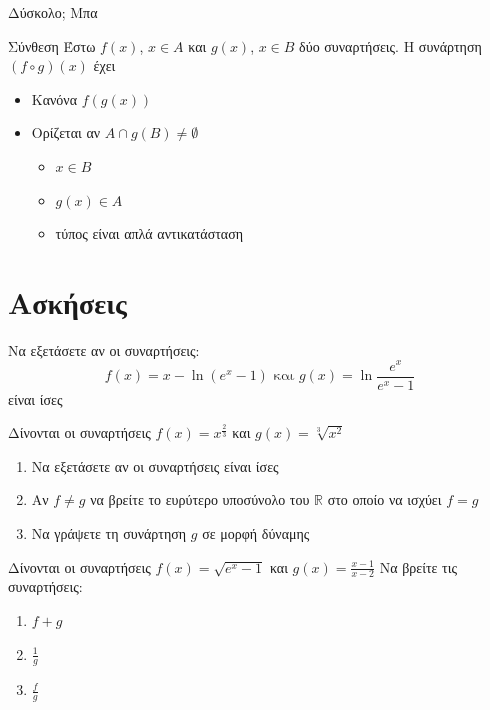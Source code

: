 \documentclass{presentation}
\begin{document}
\begin{frame}{Δύσκολο; Μπα}
  \begin{block}{Σύνθεση}
    Έστω $f(x)$, $x\in Α$ και $g(x)$, $x\in Β$ δύο συναρτήσεις. Η συνάρτηση $(f\circ g)(x)$ έχει
    \begin{itemize}
      \item Κανόνα $f(g(x))$
      \item Ορίζεται αν $Α\cap g(Β)\ne \emptyset$
            \begin{itemize}
              \item<2-> $x\in Β$
              \item<3-> $g(x)\in Α$
              \item<4-> τύπος είναι απλά αντικατάσταση
            \end{itemize}
    \end{itemize}
  \end{block}
\end{frame}

\section{Ασκήσεις}

\begin{askisi}
  Να εξετάσετε αν οι συναρτήσεις:
  $$f(x)=x-\ln (e^x-1) \text{ και } g(x)=\ln\frac{e^x}{e^x-1}$$
  είναι ίσες

\end{askisi}

\begin{askisi}
  Δίνονται οι συναρτήσεις $f(x)=x^{\frac{2}{3}}$ και $g(x)=\sqrt[3]{x^2}$
  \begin{enumerate}
    \item<1-> Να εξετάσετε αν οι συναρτήσεις είναι ίσες
    \item<2-> Αν $f\ne g$ να βρείτε το ευρύτερο υποσύνολο του $\mathbb{R}$ στο οποίο να ισχύει $f=g$
    \item<3-> Να γράψετε τη συνάρτηση $g$ σε μορφή δύναμης
  \end{enumerate}

\end{askisi}

\begin{askisi}
  Δίνονται οι συναρτήσεις $f(x)=\sqrt{e^x-1}$ και $g(x)=\frac{x-1}{x-2}$
  Να βρείτε τις συναρτήσεις:
  \begin{enumerate}
    \item<1-> $f+g$
    \item<2-> $\frac{1}{g}$
    \item<3-> $\frac{f}{g}$
  \end{enumerate}

\end{askisi}
\end{document}
